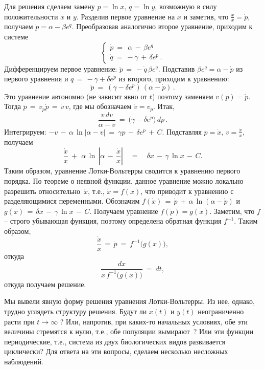 \documentclass[12pt,a4paper]{article}
\begin{document}
Для решения сделаем замену $p = \ln x, \, q = \ln y$, возможную в силу положительности
$x$ и $y$. Разделив первое уравнение на $x$ и заметив, что $\frac{\dot x}{x} = \dot p$,
получаем $\dot p = \alpha - \beta e^q$. Преобразовав аналогично второе уравнение, приходим к системе
  $$
\left\{
\begin{array}{l}
\dot p \ = \  \ \alpha \,  - \, \beta e^q\\
\dot q \ = \ - \gamma  \, + \, \delta e^p\, .
\end{array}
\right.
$$
Дифференцируем первое уравнение: $\ddot p \, = \, - \dot q \, \beta e^q$.
Подставив $\beta e^q = \alpha - \dot p$ из первого уравнения и
$\dot q \, = \, - \gamma   +  \delta e^p$ из второго, приходим к уравнению:
$$
\ddot p \ = \ (\gamma   -  \delta e^p)\, (\alpha - \dot p)\, .
$$
Это уравнение автономно (не зависит явно от $t$) поэтому заменяем $v(p) = \dot p $.
Тогда $\ddot p \, = \, v_p \dot p \, = \, \dot v \, v$, где мы обозначаем $\dot v = v_p$.
Итак,
$$
\frac{v\, d v}{\alpha - v}\ = \ \bigl(\gamma - \delta e^p \bigr) \, d p\, .
$$
Интегрируем: $ - v \, - \, \alpha\, \ln |\alpha - v|\ = \ \gamma p \, - \, \delta e^p \, + \, C$.
Подставляя $p = \dot x, \, v = \frac{\dot x}{x}$, получаем
$$
\frac{\dot x}{x} \ + \ \, \alpha\, \ln \, \left| \alpha \, - \, \frac{\dot x}{x}\right| \quad = \quad
\delta x\, - \, \gamma \, \ln x \, - \, C.
$$
Таким образом, уравнение Лотки-Вольтерры сводится к уравнению первого порядка. По теореме о неявной функции,
данное уравнение можно локально разрешить относительно~$\dot x$, т.е., $\dot x = f(x)$, что приводит к уравнению с разделяющимися переменными. Обозначим $ f(\dot x) \, = \, \dot p \, + \, \alpha\, \ln (\alpha - \dot p)$ и
$g(x) \, = \, \delta x\, - \, \gamma \, \ln x \, - \, C.$ Получаем уравнение $f(\dot p) = g(x)$.
Заметим, что $f$ -- строго убывающая функция, поэтому определена обратная функция $f^{-1}$. Таким образом,
$$
\frac{\dot x}{x}\, = \, \dot p\ = \ f^{-1} \bigl(g(x)\bigr),
$$
откуда
$$
\frac{d x}{x \, f^{-1} \bigl(g(x)\bigr)}\ = \ dt,
$$
откуда получаем решение.
\medskip

Мы вывели явную форму решения уравнения
Лотки-Вольтерры. Из нее, однако, трудно углядеть структуру решения. Будут ли $x(t)$ и $y(t)$ неограниченно расти при $t \to \infty$ ?  Или, напротив, при каких-то начальных условиях, обе эти величины стремятся к нулю, т.е.,
обе популяции вымирают~? Или эти функции периодические, т.е., система из двух биологических видов развивается циклически?
Для ответа на эти вопросы, сделаем несколько несложных наблюдений.
\end{document}
